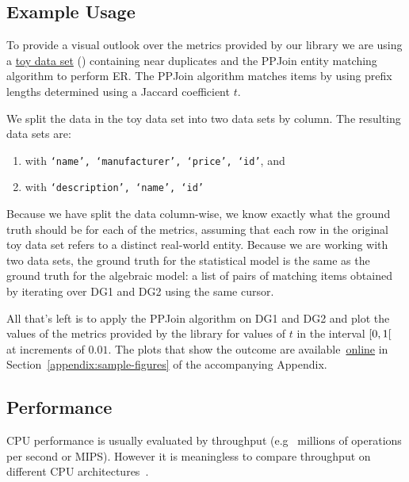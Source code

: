 \documentclass[a4paper,twoside]{article}
\newcommand{\appendixurl}{https://www.cs.ubbcluj.ro/~andrei.olar/article-data/er-metrics-library/02_appendix.pdf}
\begin{document}
    \subsection{Example Usage}

    To provide a visual outlook over the metrics provided by our library we are
    using a \href{https://github.com/matchescu/experiment-data}{toy data set}
    (\cite{expdata2023}) containing near duplicates and the PPJoin\cite{ppjoin}
    entity matching algorithm to perform ER.
    The PPJoin algorithm matches items by using prefix lengths determined using
    a Jaccard coefficient $t$.
    
    We split the data in the toy data set into two data sets by column.
    The resulting data sets are:
    
    \begin{enumerate}[label={\bfseries DG\arabic*:},leftmargin=1cm]
        \item with \texttt{`name', `manufacturer', `price', `id'},
        and
        \item with \texttt{`description', `name', `id'}\@
    \end{enumerate}

    Because we have split the data column-wise, we know exactly what the ground
    truth should be for each of the metrics, assuming that each row in the
    original toy data set refers to a distinct real-world entity.
    Because we are working with two data sets, the ground truth for the
    statistical model is the same as the ground truth for the algebraic model:
    a list of pairs of matching items obtained by iterating over DG1 and DG2
    using the same cursor.

    All that's left is to apply the PPJoin algorithm on DG1 and DG2 and plot the
    values of the metrics provided by the library for values of $t$ in the
    interval $\rinterval{0}{1}$ at increments of $0.01$.
    The plots that show the outcome are available~\href{\appendixurl}{online} in
    Section~\ref{appendix:sample-figures} of the accompanying Appendix.

    \subsection{Performance}

    CPU performance is usually evaluated by throughput (e.g~ millions of
    operations per second or MIPS).
    However it is meaningless to compare throughput on different CPU
    architectures~\cite{jain1991profiling}.
\end{document}
